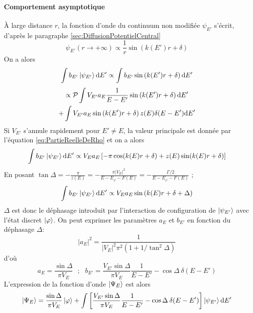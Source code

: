 \paragraph*{Comportement asymptotique} \`A large distance $r$, la fonction d'onde du continuum non modifiée $\psi_{E'}$ s'écrit, d'après le paragraphe \ref{sec:DiffusionPotentielCentral}
\begin{equation}
\psi_{E'}(r \rightarrow + \infty) \propto \frac{1}{r} \sin \left( k(E') r + \delta \right)
\end{equation}
On a alors
\begin{equation}
\int b_{E'} \ket{\psi_{E'}} \mathrm{d} E' \propto \int b_{E'} \sin \left( k(E')r + \delta \right) \mathrm{d} E'
\end{equation}
\begin{multline}
\propto \mathcal{P} \int V_{E'} a_E \frac{1}{E - E'} \sin \left( k(E')r  + \delta \right) \mathrm{d} E' \\ + \int V_{E'} a_E \sin \left( k(E')r + \delta \right) z(E) \delta(E-E') \mathrm{d} E'
\end{multline}
Si $V_{E'}$ s'annule rapidement pour $E' \neq E$, la valeur principale est donnée par l'équation \ref{eq:PartieReelleDeRho} et on a alors
\begin{equation}
\int b_{E'} \ket{\psi_{E'}} \mathrm{d} E' \propto V_E a_E \left[ - \pi \cos (k(E)r + \delta) + z(E) \sin(k(E)r + \delta) \right]
\end{equation}
En posant $\tan \Delta = - \frac{\pi}{z(E)} = - \frac{\pi |V_E|^2}{E - E_\varphi - F(E)} = - \frac{\Gamma / 2}{E - E_\varphi - F(E)}$ ;
\begin{equation}
\int b_{E'} \ket{\psi_{E'}} \mathrm{d} E' \propto V_E a_E \sin \left( k(E) r + \delta + \Delta \right)
\end{equation}
$\Delta$ est donc le déphasage introduit par l'interaction de configuration de $\ket{\psi_{E'}}$ avec l'état discret $\ket{\varphi}$. On peut exprimer les paramètres $a_E$ et $b_{E'}$ en fonction du déphasage $\Delta$:
\begin{equation}
|a_E|^2 = \frac{1}{|V_E|^2 \pi^2 \left( 1 + 1/\tan^2 \Delta \right)} 
\end{equation}
d'où
\begin{equation}
a_E = \frac{\sin \Delta}{\pi V_E} \: \: \: ; \: \: \: b_{E'} = \frac{V_{E'} \sin \Delta}{\pi V_E} \frac{1}{E - E'} - \cos \Delta \: \delta(E-E')
\label{eq:Expressions_aE_bE}
\end{equation}
L'expression de la fonction d'onde $\ket{\Psi_E}$ est alors
\begin{equation}
\ket{\Psi_E} = \frac{\sin \Delta}{\pi V_E} \ket{\varphi} + \int \left[ \frac{V_{E'} \sin \Delta}{\pi V_E} \frac{1}{E - E'} - \cos \Delta \: \delta(E-E') \right] \ket{\psi_{E'}} \mathrm{d} E'
\end{equation}


